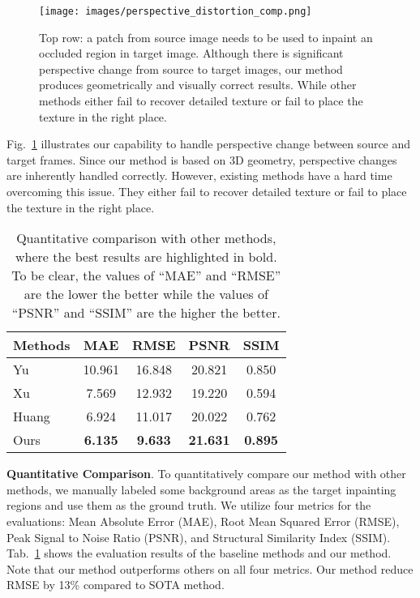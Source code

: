 \documentclass[runningheads]{llncs}
\begin{document}
\begin{figure}[b!]
\centering
\texttt{[image: images/perspective\_distortion\_comp.png]}
   \caption{Top row: a patch from source image needs to be used to inpaint an occluded region in target image. Although there is significant perspective change from source to target images, our method produces geometrically and visually correct results. While other methods either fail to recover detailed texture or fail to place the texture in the right place.}
\label{fig:perspective_comp}
\end{figure}

Fig.~\ref{fig:perspective_comp} illustrates our capability to handle perspective change between source and target frames. Since our method is based on 3D geometry, perspective changes are inherently handled correctly. However, existing methods have a hard time overcoming this issue. They either fail to recover detailed texture or fail to place the texture in the right place.





\begin{table}[]
\centering
{\begin{tabular}{ l c c c c }
\hline \hline
Methods & MAE             & RMSE            & PSNR            & SSIM            \\ \hline 
Yu~\cite{yu2018generative}     & 10.961          & 16.848          & 20.821          & 0.850          \\ 
Xu~\cite{Xu_2019_CVPR}     & 7.569          & 12.932          & 19.220          & 0.594          \\  
Huang~\cite{Huang-SigAsia-2016}  & 6.924          & 11.017          & 20.022            & 0.762          \\  
Ours   & \textbf{6.135} & \textbf{9.633} & \textbf{21.631} & \textbf{0.895} \\ \hline \hline
\end{tabular}
}
\caption{Quantitative comparison with other methods, where the best results are highlighted in bold. To be clear, the values of ``MAE'' and ``RMSE'' are the lower the better while the values of ``PSNR'' and ``SSIM'' are the higher the better. }
\label{tab:comp}
\end{table}



\textbf{Quantitative Comparison}. To quantitatively compare our method with other methods, we manually labeled some background areas as the target inpainting regions and use them as the ground truth. We utilize four metrics for the evaluations: Mean Absolute Error (MAE), Root Mean Squared Error (RMSE), Peak Signal to Noise Ratio (PSNR), and Structural Similarity Index (SSIM). Tab.~\ref{tab:comp} shows the evaluation results of the baseline methods and our method. Note that our method outperforms others on all four metrics. Our method reduce RMSE by 13\% compared to SOTA method.
\end{document}
